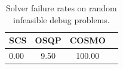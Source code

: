 \begin{table}
\centering
\caption{Solver failure rates on random infeasible debug problems.}
\label{t-random infeasible debug-failure}
\begin{tabular}{lccc}
\toprule
 SCS &  OSQP &  COSMO \\
\midrule
0.00 &  9.50 & 100.00 \\
\bottomrule
\end{tabular}
\end{table}
